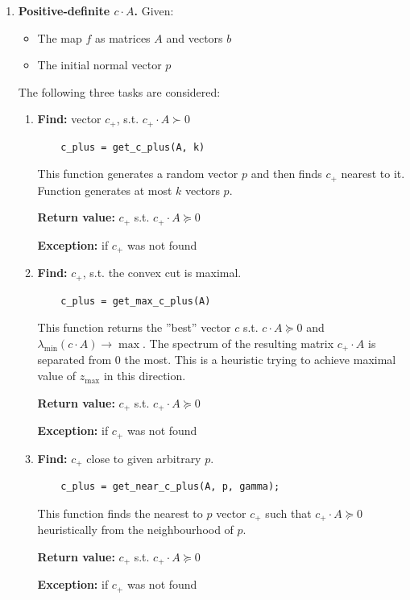 \documentclass[a4paper]{article}
\theoremstyle{definition}
\begin{document}
\begin{enumerate}
\item {\bf Positive-definite $c\cdot A$.} Given:
\begin{itemize}
	\item The map $f$ as matrices $A$ and vectors $b$
	\item The initial normal vector $p$
\end{itemize}
The following three tasks are considered:
\begin{enumerate}
	\item {\bf Find:} vector $c_+$, s.t. $c_+\cdot A\succ 0$
	
	\begin{verbatim}
	c_plus = get_c_plus(A, k)
	\end{verbatim}
	
	This function generates a random vector $p$ and then finds $c_+$ nearest to it. Function generates at most $k$ vectors $p$.
	
	{\bf Return value:} $c_+$ s.t. $c_+\cdot A\succeq 0$
	
	{\bf Exception:} if $c_+$ was not found
	
	\item {\bf Find:} $c_+$, s.t. the convex cut is maximal.
	
	\begin{verbatim}
	c_plus = get_max_c_plus(A)
	\end{verbatim}
	
	This function returns the ''best'' vector $c$ s.t. $c\cdot A\succeq 0$ and $\lambda_{\min}(c\cdot A)\to\max$. The spectrum of the resulting matrix $c_+\cdot A$ is separated from $0$ the most. This is a heuristic trying to achieve maximal value of $z_{\max}$ in this direction.
	
	{\bf Return value:} $c_+$ s.t. $c_+\cdot A\succeq 0$
	
	{\bf Exception:} if $c_+$ was not found
	
	\item {\bf Find:} $c_+$ close to given arbitrary $p$.
	
	\begin{verbatim}
	c_plus = get_near_c_plus(A, p, gamma);
	\end{verbatim}
	
	This function finds the nearest to $p$ vector $c_+$ such that $c_+\cdot A\succeq 0$ heuristically from the neighbourhood of $p$.
	
	{\bf Return value:}  $c_+$ s.t. $c_+\cdot A\succeq 0$
	
	{\bf Exception:} if $c_+$ was not found
	

\end{enumerate}
\end{enumerate}
\end{document}
